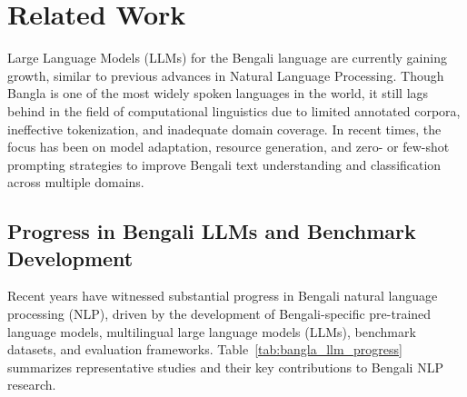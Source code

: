 \documentclass[10pt,letterpaper]{article}
\begin{document}
\section*{Related Work}
\label{sec:related}

Large Language Models (LLMs) for the Bengali language are currently gaining growth, similar to previous advances in Natural Language Processing. Though Bangla is one of the most widely spoken languages in the world, it still lags behind in the field of computational linguistics due to limited annotated corpora, ineffective tokenization, and inadequate domain coverage. In recent times, the focus has been on model adaptation, resource generation, and zero- or few-shot prompting strategies to improve Bengali text understanding and classification across multiple domains.

\subsection*{Progress in Bengali LLMs and Benchmark Development}

Recent years have witnessed substantial progress in Bengali natural language processing (NLP), driven by the development of Bengali-specific pre-trained language models, multilingual large language models (LLMs), benchmark datasets, and evaluation frameworks. Table~\ref{tab:bangla_llm_progress} summarizes representative studies and their key contributions to Bengali NLP research.
\end{document}
